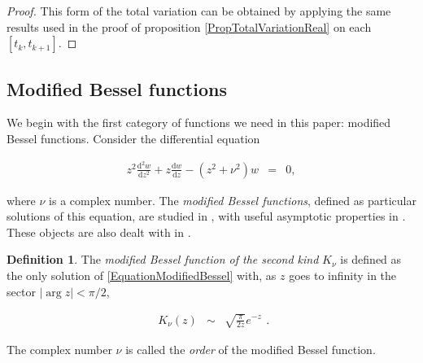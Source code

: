 \documentclass{jams-l}
\theoremstyle{definition}
\newtheorem{definition}[theorem]{Definition}
\theoremstyle{remark}
\numberwithin{equation}{section}
\begin{document}
        \begin{proof}
        
            This form of the total variation can be obtained by applying the same results used in the proof of proposition \ref{PropTotalVariationReal} on each $\left[ t_k, t_{k+1} \right]$.
        
        \end{proof}
    

    \subsection{Modified Bessel functions}
    \label{AppModifiedBessel}
    
        We begin with the first category of functions we need in this paper: modified Bessel functions. Consider the differential equation
        
        \begin{equation}
        \label{EquationModifiedBessel}
            \begin{array}{lll}
                z^2 \frac{\mathrm{d}^2 w}{\mathrm{d}z^2} + z \frac{\mathrm{d} w}{\mathrm{d} z} - \left( z^2 + \nu^2 \right) w & = & 0,
            \end{array}
        \end{equation}
        
        \noindent where $\nu$ is a complex number. The \textit{modified Bessel functions}, defined as particular solutions of this equation, are studied in \cite[Sec. 2.10 \& 7.8]{MR1429619}, with useful asymptotic properties in \cite[Sec. 10.7]{MR1429619}. These objects are also dealt with in \cite[Sec. 10.25]{MR2723248}.
        
        \begin{definition}
        
            The \textit{modified Bessel function of the second kind} $K_{\nu}$ is defined as the only solution of \ref{EquationModifiedBessel} with, as $z$ goes to infinity in the sector $\left \vert \arg z \right \vert < \pi / 2$,
            
            \[ \begin{array}{lll}
                    K_{\nu} \left( z \right) & \sim & \sqrt{\frac{\pi}{2z}} e^{-z}
                \end{array} . \]
            
            \noindent The complex number $\nu$ is called the \textit{order} of the modified Bessel function.
        
        \end{definition}
        
\end{document}
